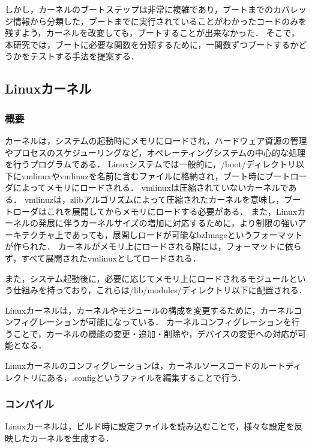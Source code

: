 \documentclass[graduation-thesis]{mlarticle}
\begin{document}
しかし，カーネルのブートステップは非常に複雑であり，ブートまでのカバレッジ情報から分類した，ブートまでに実行されていることがわかったコードのみを残すよう，カーネルを改変しても，ブートすることが出来なかった．
そこで，本研究では，ブートに必要な関数を分類するために，一関数ずつブートするかどうかをテストする手法を提案する．

\subsection{Linuxカーネル}
\label{propo:linux}

\subsubsection{概要}
\label{propo:linux:abstruction}
カーネルは，システムの起動時にメモリにロードされ，ハードウェア資源の管理やプロセスのスケジューリングなど，オペレーティングシステムの中心的な処理を行うプログラムである．
Linuxシステムでは一般的に，/boot/ディレクトリ以下にvmlinuxやvmlinuzを名前に含むファイルに格納され，ブート時にブートローダによってメモリにロードされる．
vmlinuxは圧縮されていないカーネルである．
vmlinuzは，zlibアルゴリズムによって圧縮されたカーネルを意味し，ブートローダはこれを展開してからメモリにロードする必要がある．
また，Linuxカーネルの発展に伴うカーネルサイズの増加に対応するために，より制限の強いアーキテクチャ上であっても，展開しロードが可能なbzImageというフォーマットが作られた．
カーネルがメモリ上にロードされる際には，フォーマットに依らず，すべて展開されたvmlinuxとしてロードされる．

また，システム起動後に，必要に応じてメモリ上にロードされるモジュールという仕組みを持っており，これらは/lib/modules/ディレクトリ以下に配置される．

Linuxカーネルは，カーネルやモジュールの構成を変更するために，カーネルコンフィグレーションが可能になっている．
カーネルコンフィグレーションを行うことで，カーネルの機能の変更・追加・削除や，デバイスの変更への対応が可能となる．

Linuxカーネルのコンフィグレーションは，カーネルソースコードのルートディレクトリにある，.configというファイルを編集することで行う．

\subsubsection{コンパイル}
\label{propo:linux:compile}
Linuxカーネルは，ビルド時に設定ファイルを読み込むことで，様々な設定を反映したカーネルを生成する．
\end{document}
